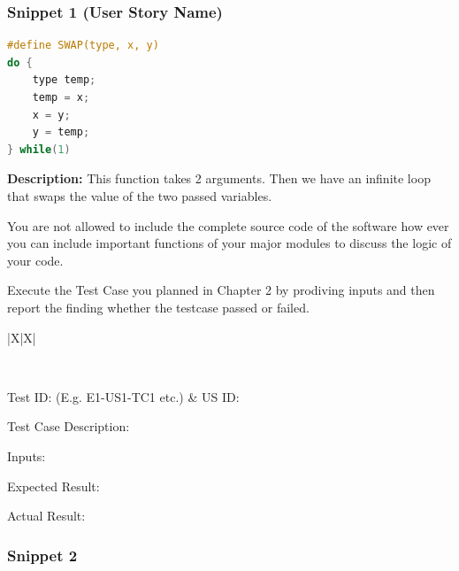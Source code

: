 \subsubsection{Snippet 1 (User Story Name)}

\begin{lstlisting}[language=C]
#define SWAP(type, x, y) 
do { 
    type temp; 
    temp = x; 
    x = y; 
    y = temp; 
} while(1)
\end{lstlisting}

\textbf{Description:} This function takes 2 arguments. Then we have an infinite loop that swaps the value of the two passed variables.

You are not allowed to include the complete source code of the software how ever you can include important functions of your major modules to discuss the logic of your code.


Execute the Test Case you planned in Chapter 2 by prodiving inputs and then report the finding whether the testcase passed or failed.

{
\setModernTableStyle %
\begin{xltabular}{\textwidth}{|X|X|}

    \hiderowcolors
    \caption{Test Case 1} \label{tab:test_case_ch4_1} \\
    \hline
    \showrowcolors

    Test ID: (E.g. E1-US1-TC1 etc.) & US ID: \\ \hline

    {Test Case Description: } \\ \hline

    {Inputs:} \\ \hline

    {Expected Result:} \\ \hline

    {Actual Result:} \\ \hline

\end{xltabular}
}

\subsubsection{Snippet 2}

